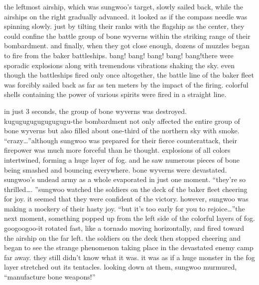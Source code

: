  the leftmost airship, which was sungwoo’s target, slowly sailed back, while the airships on the right gradually advanced.
 it looked as if the compass needle was spinning slowly.
just by tilting their ranks with the flagship as the center, they could confine the battle group of bone wyverns within the striking range of their bombardment.
and finally, when they got close enough, dozens of muzzles began to fire from the baker battleships.
bang! bang! bang! bang! bang!there were sporadic explosions along with tremendous vibrations shaking the sky.
even though the battleships fired only once altogether, the battle line of the baker fleet was forcibly sailed back as far as ten meters by the impact of the firing.
colorful shells containing the power of various spirits were fired in a straight line.


in just 3 seconds, the group of bone wyverns was destroyed.
kugugugugugugugugu-the bombardment not only affected the entire group of bone wyverns but also filled about one-third of the northern sky with smoke.
“crazy…”although sungwoo was prepared for their fierce counterattack, their firepower was much more forceful than he thought.
explosions of all colors intertwined, forming a huge layer of fog.
 and he saw numerous pieces of bone being smashed and bouncing everywhere.
bone wyverns were devastated.
 sungwoo’s undead army as a whole evaporated in just one moment.
“they’re so thrilled….
”sungwoo watched the soldiers on the deck of the baker fleet cheering for joy.
 it seemed that they were confident of the victory.
however, sungwoo was making a mockery of their hasty joy.
“but it’s too early for you to rejoice…”the next moment, something popped up from the left side of the colorful layers of fog.
googoogoo-it rotated fast, like a tornado moving horizontally, and fired toward the airship on the far left.
the soldiers on the deck then stopped cheering and began to see the strange phenomenon taking place in the devastated enemy camp far away.
 they still didn’t know what it was.
it was as if a huge monster in the fog layer stretched out its tentacles.
looking down at them, sungwoo murmured, “manufacture bone weapons!”

 